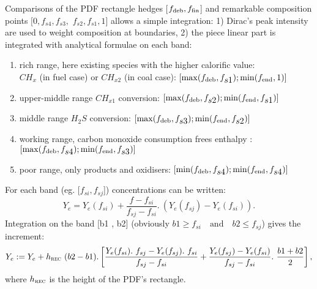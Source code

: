 Comparisons of the PDF rectangle hedges [$f_{\mbox{\scriptsize deb}} ,
f_{\mbox{\scriptsize fin}}$] and remarkable composition points $[0,
f_{\displaystyle s4}, f_{\displaystyle s3},$ $f_{\displaystyle s2},
f_{\displaystyle s1}, 1]$ allows a simple integration: 1) Dirac's peak
intensity are used to weight composition at boundaries, 2) the piece linear part
is integrated with analytical formulae on each band:

\begin{enumerate}
\item rich range, here existing species with the higher calorific value: \\
  \hspace{0.25cm}$CH_{x}$ (in fuel case) or $CH_{x2}$ (in coal case):
  $[\max(f_{\mbox{\scriptsize deb}},f_{\displaystyle s1}) ;
  \min(f_{\mbox{\scriptsize end}},1)]$
\item upper-middle range $CH_{x1}$ conversion: $[\max(f_{\mbox{\scriptsize
      deb}},f_{\displaystyle s2} ); \min (f_{\mbox{\scriptsize
      end}},f_{\displaystyle s1})]$
\item middle range $H_{2}S$ conversion: $[\max(f_{\mbox{\scriptsize
      deb}},f_{\displaystyle s3} ); \min (f_{\mbox{\scriptsize
      end}},f_{\displaystyle s2})]$
\item working range, carbon monoxide consumption frees enthalpy :
  $[\max(f_{\mbox{\scriptsize deb}},f_{\displaystyle s4} ); \min
  (f_{\mbox{\scriptsize end}},f_{\displaystyle s3})]$
\item poor range, only products and oxidisers: $[\min(f_{\mbox{\scriptsize
      deb}},f_{\displaystyle s4} ); \min (f_{\mbox{\scriptsize
      end}},f_{\displaystyle s4})]$
\end{enumerate}
For each band (eg. [$f_{\displaystyle si} , f_{\displaystyle sj}$])
concentrations can be written:
\begin{equation*}
  Y_e = Y_{e}(f_{si}) + \dfrac{f-f_{si}}{f_{sj}-f_{si}} .~ \left( Y_{e}(f_{sj})-Y_{e}(f_{si}) \right).
\end{equation*}
Integration on the band [b1 , b2] (obviously $b1 \geq f_{si} \quad \text{and}
\quad b2 \leq f_{sj}$) gives the increment:
\begin{equation*}
  Y_{e} :=  Y_e + h_{\mbox{\scriptsize \textsc{rec}}}~(b2-b1)  .  \left[ \dfrac{Y_{e}(f_{si}).~f_{sj}-Y_{e}(f_{sj}).~f_{si}}{f_{sj}-f_{si}}
   +         \dfrac{Y_{e}(f_{sj})-Y_{e}(f_{si})}{f_{sj}-f_{si}}.~\dfrac{b1+b2}{2} \right],
\end{equation*}
where $h_{\mbox{\scriptsize \textsc{rec}}}$ is the height of the PDF's
rectangle.


